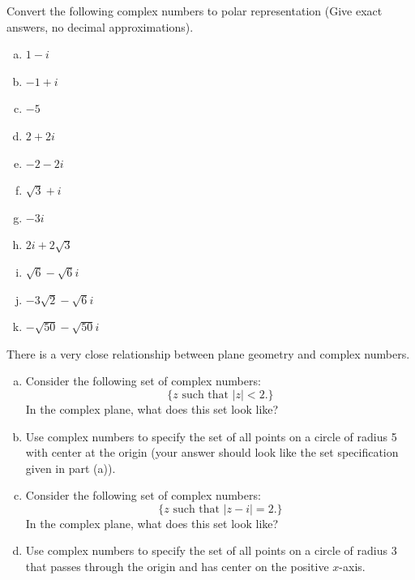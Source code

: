 {\begin{exercise}
\begin{multicols}{2}
\begin{enumerate}[(a)]
\end{enumerate}
\end{multicols}
\end{exercise}

\begin{exercise}\label{exercise:complex:22}
Convert the following complex numbers to polar representation (Give exact answers, no decimal approximations).
\begin{multicols}{3}
\begin{enumerate}[(a)]
 
 \item
$1-i$
\item
$-1 + i$
 \item
$-5$
 \item
$2+2i$
\item
$-2 - 2i$
\item
$\sqrt{3} + i$
 \item
$-3i$
 \item
$2i + 2 \sqrt{3}$
\item
$\sqrt{6} - \sqrt{6}i$
\item
$-3\sqrt{2} - \sqrt{6}i$
\item
$-\sqrt{50} - \sqrt{50}i$
  
\end{enumerate}
\end{multicols}
\end{exercise}

\begin{exercise}\label{exercise:complex:23}
There is a very close relationship between plane geometry and complex numbers.
\begin{enumerate}[(a)]
\item
Consider the following set of complex numbers:
\[ \{z \text{ such that } |z| < 2. \} \]
In the complex plane, what does this set look like?
\item
Use complex numbers to specify the set of all points on a circle of radius 5 with center at the origin (your answer should look like the set specification given in part (a)).
\item
Consider the following set of complex numbers:
\[ \{z \text{ such that } |z-i| = 2. \} \]
In the complex plane, what does this set look like?
\item
Use complex numbers to specify the set of all points on a circle of radius 3 that passes through the origin and has center on the positive $x$-axis.
\end{enumerate}
\end{exercise}

}
